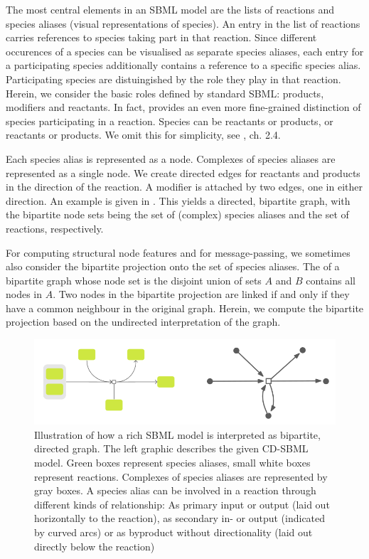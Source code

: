 \documentclass[
	fontsize=10pt, %
	twoside=false, %
	secnumdepth=1, %
  toc=indentunnumbered %
]{kaobook}
\begin{document}
The most central elements in an SBML model are the lists of reactions and
species aliases (visual representations of species). 
%
An entry in the list of reactions carries references to species taking part in
that reaction. Since different occurences of a species can be visualised as
separate species aliases, each entry for a participating species additionally
contains a reference to a specific species alias. Participating species are
distuingished by the role they play in that reaction. Herein, we consider the
basic roles defined by standard SBML: products, modifiers and reactants.
In fact,  provides an even more fine-grained
distinction of species participating in a reaction. Species can be 
reactants or products,  or  reactants or
products. We omit this for simplicity, see
\cite{_CellDesignerExtensionTag_2010}, ch. 2.4.

Each species alias is represented as a node. Complexes of species aliases are
represented as a single node.
We create directed edges for reactants and products in the
direction of the reaction. A modifier is attached by two edges, one in either
direction. An example is given in . This yields a
directed, bipartite graph, with the bipartite node sets being the set of
(complex) species aliases and the set of reactions, respectively.

For computing structural node features and for message-passing, we sometimes
also consider the bipartite projection onto the set of species aliases. The
 of a bipartite graph whose node set is the
disjoint union of sets $A$ and $B$ contains all nodes in $A$. Two nodes in the
bipartite projection are linked if and only if they have a common neighbour in
the original graph. Herein, we compute the bipartite projection based on the
undirected interpretation of the graph.

\begin{figure}[h]
  \centering
  \includegraphics[width=0.7\linewidth]{graph-interpretation.png}
  \caption[Illustration how a rich SBML model is interpreted as a
  graph.]{Illustration of how a rich SBML model is interpreted as bipartite,
    directed graph. The left graphic describes the given CD-SBML model. Green
    boxes represent species aliases, small white boxes represent reactions.
    Complexes of species aliases are represented by gray boxes. A species alias
    can be involved in a reaction through different kinds of relationship: As
    primary input or output (laid out horizontally to the reaction), as
    secondary in- or output (indicated by curved arcs) or as byproduct without
    directionality (laid out directly below the reaction)}
  \label{fig:graph-construction}
\end{figure}
\end{document}
